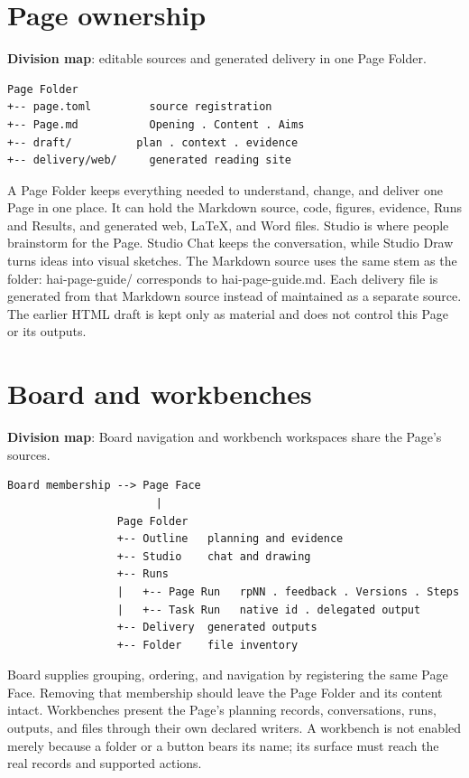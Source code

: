 
\section{Page ownership}
\textbf{Division map}: editable sources and generated delivery in one Page Folder.

\begin{verbatim}
Page Folder
+-- page.toml         source registration
+-- Page.md           Opening . Content . Aims
+-- draft/          plan . context . evidence
+-- delivery/web/     generated reading site
\end{verbatim}
A Page Folder keeps everything needed to understand, change, and deliver one Page in one place. It can hold the Markdown source, code, figures, evidence, Runs and Results, and generated web, LaTeX, and Word files. Studio is where people brainstorm for the Page. Studio Chat keeps the conversation, while Studio Draw turns ideas into visual sketches. The Markdown source uses the same stem as the folder: hai-page-guide/ corresponds to hai-page-guide.md. Each delivery file is generated from that Markdown source instead of maintained as a separate source. The earlier HTML draft is kept only as material and does not control this Page or its outputs.


\section{Board and workbenches}
\textbf{Division map}: Board navigation and workbench workspaces share the Page's sources.

\begin{verbatim}
Board membership --> Page Face
                       |
                 Page Folder
                 +-- Outline   planning and evidence
                 +-- Studio    chat and drawing
                 +-- Runs
                 |   +-- Page Run   rpNN . feedback . Versions . Steps
                 |   +-- Task Run   native id . delegated output
                 +-- Delivery  generated outputs
                 +-- Folder    file inventory
\end{verbatim}
Board supplies grouping, ordering, and navigation by registering the same Page Face. Removing that membership should leave the Page Folder and its content intact. Workbenches present the Page's planning records, conversations, runs, outputs, and files through their own declared writers. A workbench is not enabled merely because a folder or a button bears its name; its surface must reach the real records and supported actions.

